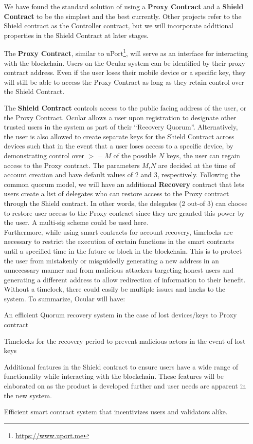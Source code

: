 \documentclass[a4paper]{article}
\let\tempone\itemize
\let\temptwo\enditemize
\renewenvironment{itemize}{\tempone\addtolength{\itemsep}{-5pt}}{\temptwo}
\begin{document}
We have found the standard solution of using a \textbf{Proxy Contract} and a \textbf{Shield Contract} to be the simplest and the best currently. Other projects refer to the Shield contract as the Controller contract, but we will incorporate additional properties in the Shield Contract at later stages. 

The \textbf{Proxy Contract}, similar to uPort\footnote{\url{https://www.uport.me}}, will serve as an interface for interacting with the blockchain. Users on the Ocular system can be identified by their proxy contract address. Even if the user loses their mobile device or a specific key, they will still be able to access the Proxy Contract as long as they retain control over the Shield Contract.

The \textbf{Shield Contract} controls access to the public facing address of the user, or the Proxy Contract. Ocular allows a user upon registration to designate other trusted users in the system as part of their ``Recovery Quorum''. Alternatively, the user is also allowed to create separate keys for the Shield Contract across devices such that in the event that a user loses access to a specific device, by demonstrating control over $>= M$ of the possible $N$ keys, the user can regain access to the Proxy contract. The parameters $M$,$N$ are decided at the time of account creation and  have default values of $2$ and $3$, respectively. 
Following the common quorum model, we will have an additional \textbf{Recovery} contract that lets users create a list of delegates who can restore access to the Proxy contract through the Shield contract. In other words, the delegates (2 out-of 3) can choose to restore user access to the Proxy contract since they are granted this power by the user. A multi-sig scheme could be used here.\\

Furthermore, while using smart contracts for account recovery, timelocks are necessary to restrict the execution of certain functions in the smart contracts until a specified time in the future or block in the blockchain. This is to protect the user from mistakenly or misguidedly generating a new address in an unnecessary manner and from malicious attackers targeting honest users and generating a different address to allow redirection of information to their benefit. Without a timelock, there could easily be multiple issues and hacks to the system.
\newline
To summarize, Ocular will have:
\begin{itemize}
\item An efficient Quorum recovery system in the case of lost devices/keys to Proxy contract
\item Timelocks for the recovery period to prevent malicious actors in the event of lost keys
\item Additional features in the Shield contract to ensure users have a wide range of functionality while interacting with the blockchain. These features will be elaborated on as the product is developed further and user needs are apparent in the new system. 
\item Efficient smart contract system that incentivizes users and validators alike. 
\end{itemize} 
\end{document}
